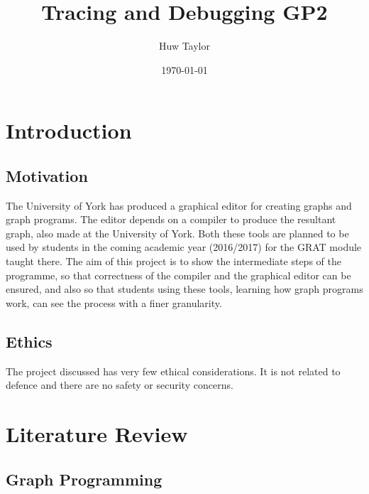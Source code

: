 \documentclass{UoYCSproject}
\author{Huw Taylor}
\title{Tracing and Debugging GP2}
\date{\today}
\begin{document}
\maketitle
\tableofcontents
\listoffigures

\chapter{Introduction}
\section{Motivation}
The University of York has produced a graphical editor for creating graphs and graph programs. The editor depends on a compiler to produce the resultant graph, also made at the University of York. Both these tools are planned to be used by students in the coming academic year (2016/2017) for the GRAT module taught there.
The aim of this project is to show the intermediate steps of the programme, so that correctness of the compiler and the graphical editor can be ensured, and also so that students using these tools, learning how graph programs work, can see the process with a finer granularity.
\section{Ethics}
The project discussed has very few ethical considerations. It is not related to defence and there are no safety or security concerns.

\chapter{Literature Review}
\section{Graph Programming}
\end{document}
